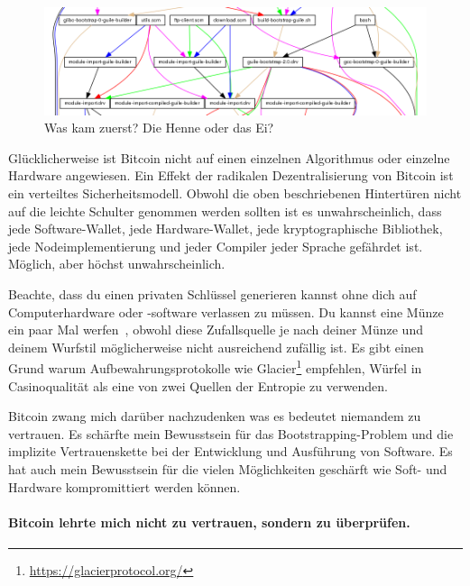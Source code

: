 \begin{figure}
  \includegraphics{assets/images/guix-bootstrap-dependencies.png}
  \caption{Was kam zuerst? Die Henne oder das Ei?}
  \label{fig:guix-bootstrap-dependencies}
\end{figure}

Glücklicherweise ist Bitcoin nicht auf einen einzelnen Algorithmus oder einzelne
Hardware angewiesen. Ein Effekt der radikalen Dezentralisierung von Bitcoin ist
ein verteiltes Sicherheitsmodell. Obwohl die oben beschriebenen Hintertüren
nicht auf die leichte Schulter genommen werden sollten ist es unwahrscheinlich,
dass jede Software-Wallet, jede Hardware-Wallet, jede kryptographische
Bibliothek, jede Nodeimplementierung und jeder Compiler jeder Sprache gefährdet
ist. Möglich, aber höchst unwahrscheinlich.

Beachte, dass du einen privaten Schlüssel generieren kannst ohne dich auf
Computerhardware oder -software verlassen zu müssen. Du kannst eine Münze ein
paar Mal werfen~\cite{antonopoulos2014mastering}, obwohl diese Zufallsquelle je
nach deiner Münze und deinem Wurfstil möglicherweise nicht ausreichend zufällig
ist. Es gibt einen Grund warum Aufbewahrungsprotokolle wie
Glacier\footnote{\url{https://glacierprotocol.org/}} empfehlen, Würfel in
Casinoqualität als eine von zwei Quellen der Entropie zu verwenden.

Bitcoin zwang mich darüber nachzudenken was es bedeutet niemandem zu vertrauen.
Es schärfte mein Bewusstsein für das Bootstrapping-Problem und die implizite
Vertrauenskette bei der Entwicklung und Ausführung von Software. Es hat auch
mein Bewusstsein für die vielen Möglichkeiten geschärft wie Soft- und Hardware
kompromittiert werden können.

\paragraph{Bitcoin lehrte mich nicht zu vertrauen, sondern zu überprüfen.}

